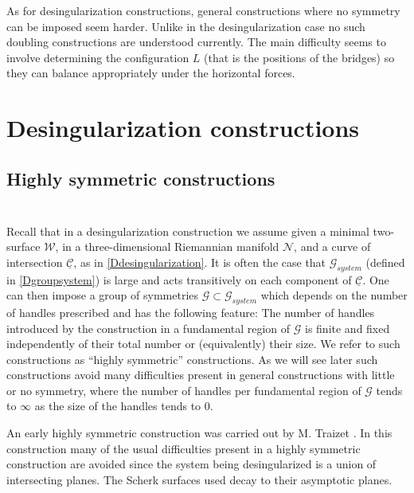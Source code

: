 \documentclass[12pt,namelimits,sumlimits]{amsart}
\theoremstyle{remark}
\numberwithin{equation}{section}
\begin{document}
As for desingularization constructions,
general constructions where no symmetry can be imposed seem harder.
Unlike in the desingularization case no such doubling constructions are understood currently.
The main difficulty seems to involve determining the configuration $L$ (that is the positions of the bridges)
so they can balance appropriately under the horizontal forces.

\section{Desingularization constructions}
\label{Sdesingularization}
\nopagebreak

\subsection*{Highly symmetric constructions}
$\phantom{ab}$
\nopagebreak

Recall that in a desingularization construction we assume given 
a minimal two-surface ${{\mathcal{W}}}$,
in a three-dimensional Riemannian manifold ${{\mathcal{N}}}$,
and a curve of intersection ${\underline{{\mathcal{C}}}}$,
as in \ref{Ddesingularization}.
It is often the case that ${{\mathscr{G}_{system}}}$ (defined in \ref{Dgroupsystem})
is large and acts transitively on each component of ${\underline{{\mathcal{C}}}}$.
One can then impose a group of symmetries ${{\mathscr{G}}}\subset{{\mathscr{G}_{system}}}$ which depends on the number
of handles prescribed and has the following feature:
The number of handles introduced by the construction in a fundamental region of ${{\mathscr{G}}}$ is finite and fixed
independently of their total number
or (equivalently) their size.
We refer to such constructions as ``highly symmetric'' constructions.
As we will see later such constructions avoid many difficulties present in general constructions with little or no symmetry,
where the number of handles per fundamental region of ${{\mathscr{G}}}$ tends to $\infty$ as the size of the handles tends to $0$.

An early highly symmetric construction 
was carried out by M. Traizet \cite{T2}.
In this construction many of the usual difficulties present in a highly symmetric construction are avoided
since the system being desingularized is a union of intersecting planes.
The Scherk surfaces used decay to their asymptotic planes.
\end{document}
